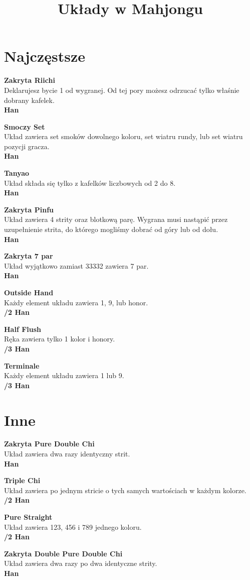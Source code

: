 \documentclass[12pt, a4paper]{article}
\title{Układy w Mahjongu}
\newcommand{\conc}[1]{\textbf{\color{BrickRed}Zakryta \color{Black} #1}\\}
\newcommand{\han}[1]{\\ \textbf{\color{BrickRed}\link{#1 }\color{Black}Han}}
\newcommand{\chan}[2]{\\ \textbf{\color{PineGreen}\link{#1}\color{Black}/\color{BrickRed}#2 \color{Black}Han}}
\begin{document}
    \section*{Najczęstsze}
    \conc{Riichi}
    Deklarujesz bycie 1 od wygranej. Od tej pory możesz odrzucać tylko właśnie dobrany kafelek. \han{1}

    \vspace*{1cm}

    \textbf{Smoczy Set\\}
    Układ zawiera set smoków dowolnego koloru, set wiatru rundy, lub set wiatru pozycji gracza. \han{1}

    \textbf{Tanyao\\}
    Układ składa się tylko z kafelków liczbowych od 2 do 8. \han{1}

    \conc{Pinfu}
    Układ zawiera 4 strity oraz blotkową parę. Wygrana musi nastąpić przez uzupełnienie 
    strita, do którego mogliśmy dobrać od góry lub od dołu. \han{1}

    \vspace*{1cm}

    \conc{7 par}
    Układ wyjątkowo zamiast 33332 zawiera 7 par. \han{2}

    \textbf{Outside Hand\\}
    Każdy element układu zawiera 1, 9, lub honor. \chan{1}{2}

    \textbf{Half Flush\\}
    Ręka zawiera tylko 1 kolor i honory. \chan{2}{3}

    \textbf{Terminale\\}
    Każdy element układu zawiera 1 lub 9. \chan{2}{3}


    \pagebreak
    \section*{Inne}

    \conc{Pure Double Chi}
    Układ zawiera dwa razy identyczny strit. \han{1}

    \textbf{Triple Chi \\}
    Układ zawiera po jednym stricie o tych samych wartościach w każdym kolorze. \chan{1}{2}

    \textbf{Pure Straight \\}
    Układ zawiera 123, 456 i 789 jednego koloru. \chan{1}{2}

    \conc{Double Pure Double Chi}
    Układ zawiera dwa razy po dwa identyczne strity. \han{3}
\end{document}
